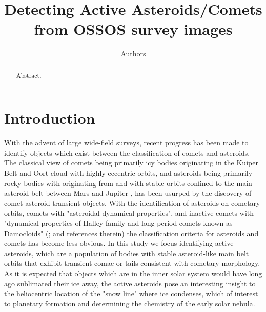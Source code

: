 \documentclass[iop,apj]{emulateapj}
\begin{document}
\title{Detecting Active Asteroids/Comets from OSSOS survey images}
\author{Authors}

\begin{abstract}
Abstract.
\end{abstract}

\maketitle

\section{Introduction}

With the advent of large wide-field surveys, recent progress has been made to identify objects which exist between the classification of comets and asteroids. The classical view of comets being primarily icy bodies originating in the Kuiper Belt and Oort cloud with highly eccentric orbits, and asteroids being primarily rocky bodies with originating from and with stable orbits confined to the main asteroid belt between Mars and Jupiter \citep{sheppard14}, has been usurped by the discovery of comet-asteroid transient objects. With the identification of asteroids on cometary orbits, comets with "asteroidal dynamical properties", and inactive comets with "dynamical properties of Halley-family and long-period comets known as Damocloids" (\cite{sonnett11}; and references therein) the classification criteria for asteroids and comets has become less obvious. In this study we focus identifying active asteroids, which are a population of bodies with stable asteroid-like main belt orbits that exhibit transient comae or tails consistent with cometary morphology.  As it is expected that objects which are in the inner solar system would have long ago sublimated their ice away, the active asteroids pose an interesting insight to the heliocentric location of the "snow line" where ice condenses, which of interest to planetary formation and determining the chemistry of the early solar nebula.

\end{document}
